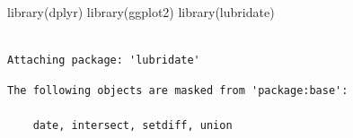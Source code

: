 \documentclass[
]{article}
\newenvironment{Shaded}{\begin{snugshade}}{\end{snugshade}}
\newcommand{\FunctionTok}[1]{\textcolor[rgb]{0.28,0.35,0.67}{#1}}
\newcommand{\NormalTok}[1]{\textcolor[rgb]{0.00,0.23,0.31}{#1}}
\begin{document}
\begin{Shaded}
\begin{Highlighting}[]
\FunctionTok{library}\NormalTok{(dplyr)}
\FunctionTok{library}\NormalTok{(ggplot2)}
\FunctionTok{library}\NormalTok{(lubridate)}
\end{Highlighting}
\end{Shaded}

\begin{verbatim}

Attaching package: 'lubridate'
\end{verbatim}

\begin{verbatim}
The following objects are masked from 'package:base':

    date, intersect, setdiff, union
\end{verbatim}
\end{document}
